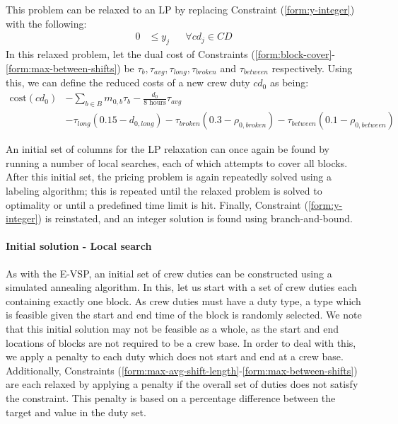 \documentclass[]{article}
\begin{document}
This problem can be relaxed to an LP by replacing Constraint (\ref{form:y-integer}) with the following:
\begin{align}
0 &\leq y_{j} && \forall cd_j \in \textit{CD}
\end{align}
In this relaxed problem, let the dual cost of Constraints (\ref{form:block-cover}-\ref{form:max-between-shifts}) be $\tau_{b}, \tau_{\textit{avg}}, \tau_{\textit{long}}, \tau_{\textit{broken}}$ and $\tau_{\textit{between}}$ respectively. Using this, we can define the reduced costs of a new crew duty $cd_0$ as being: 
\begin{align}
\text{cost}(cd_0) 
&- \sum_{b \in B} m_{0,b} \tau_{b} 
- \frac{d_0}{\text{8 hours}} \tau_{\textit{avg}} \nonumber \\
&- \tau_{\textit{long}} (0.15 - d_{0,\textit{long}}) 
- \tau_{\textit{broken}} (0.3 - \rho_{0,\textit{broken}}) 
- \tau_{\textit{between}} (0.1 - \rho_{0,\textit{between}})
\end{align}

An initial set of columns for the LP relaxation can once again be found by running a number of local searches, each of which attempts to cover all blocks. After this initial set, the pricing problem is again repeatedly solved using a labeling algorithm; this is repeated until the relaxed problem is solved to optimality or until a predefined time limit is hit. Finally, Constraint (\ref{form:y-integer}) is reinstated, and an integer solution is found using branch-and-bound.

\paragraph{Initial solution - Local search}
As with the E-VSP, an initial set of crew duties can be constructed using a simulated annealing algorithm. In this, let us start with a set of crew duties each containing exactly one block. As crew duties must have a duty type, a type which is feasible given the start and end time of the block is randomly selected. We note that this initial solution may not be feasible as a whole, as the start and end locations of blocks are not required to be a crew base. In order to deal with this, we apply a penalty to each duty which does not start and end at a crew base. Additionally, Constraints (\ref{form:max-avg-shift-length}-\ref{form:max-between-shifts}) are each relaxed by applying a penalty if the overall set of duties does not satisfy the constraint. This penalty is based on a percentage difference between the target and value in the duty set.
\end{document}
